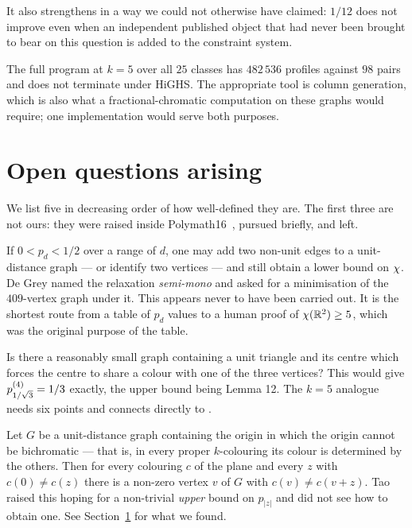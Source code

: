 It also strengthens  in a way we could not otherwise have claimed:
$1/12$ does not improve even when an independent published object that had never
been brought to bear on this question is added to the constraint system.

\begin{remark}[practical]
The full program at $k=5$ over all $25$ classes has $482\,536$ profiles against
$98$ pairs and does not terminate under HiGHS. The appropriate tool is column
generation, which is also what a fractional-chromatic computation on these
graphs would require; one implementation would serve both purposes.
\end{remark}

\section{Open questions arising}
\label{sec:openA}

We list five in decreasing order of how well-defined they are. The first three
are not ours: they were raised inside Polymath16~\cite{Polymath16}, pursued briefly, and left.

\begin{problem}
If $0<p_d<1/2$ over a range of $d$, one may add two non-unit edges to a
unit-distance graph --- or identify two vertices --- and still obtain a lower
bound on $\chi$. De Grey named the relaxation \emph{semi-mono} and asked for a
minimisation of the $409$-vertex graph under it. This appears never to have been
carried out. It is the shortest route from a table of $p_d$ values to a human
proof of $\chi(\mathbb{R}^2)\ge5$, which was the original purpose of the table.
\end{problem}

\begin{problem}
Is there a reasonably small graph containing a unit triangle and its centre
which forces the centre to share a colour with one of the three vertices? This
would give $p^{(4)}_{1/\sqrt3}=1/3$ exactly, the upper bound being Lemma 12. The
$k=5$ analogue needs six points and connects directly to .
\end{problem}

\begin{problem}
\label{prob:tao}
Let $G$ be a unit-distance graph containing the origin in which the origin
cannot be bichromatic --- that is, in every proper $k$-colouring its colour is
determined by the others. Then for every colouring $c$ of the plane and every
$z$ with $c(0)\ne c(z)$ there is a non-zero vertex $v$ of $G$ with
$c(v)\ne c(v+z)$. Tao~\cite{Polymath16} raised this hoping for a non-trivial \emph{upper} bound on
$p_{|z|}$ and did not see how to obtain one. See Section~\ref{sec:openA} for what we
found.
\end{problem}

